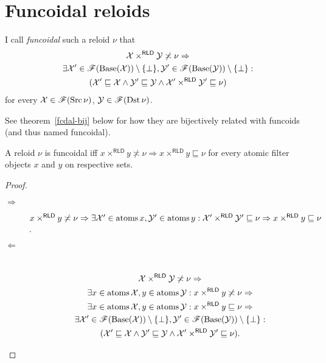 \section{\label{fcd-rld}Funcoidal reloids}
\begin{defn}
I call \emph{funcoidal} such a reloid $\nu$
that
\begin{multline*}
\mathcal{X}\times^{\mathsf{RLD}}\mathcal{Y}\not\asymp\nu\Rightarrow\\
\exists\mathcal{X}'\in\mathscr{F}(\operatorname{Base}(\mathcal{X}))\setminus\{\bot\},\mathcal{Y}'\in\mathscr{F}(\operatorname{Base}(\mathcal{Y}))\setminus\{\bot\}:\\
(\mathcal{X}'\sqsubseteq\mathcal{X}\land\mathcal{Y}'\sqsubseteq\mathcal{Y}\land\mathcal{X}'\times^{\mathsf{RLD}}\mathcal{Y}'\sqsubseteq\nu)
\end{multline*}
for every $\mathcal{X}\in\mathscr{F}(\operatorname{Src}\nu)$, $\mathcal{Y}\in\mathscr{F}(\operatorname{Dst}\nu)$.\end{defn}
\begin{rem}
See theorem~\ref{fcdal-bij} below for how they are bijectively related with funcoids (and thus named funcoidal).
\end{rem}
\begin{prop}
A reloid $\nu$ is funcoidal iff $x\times^{\mathsf{RLD}}y\nasymp\nu\Rightarrow x\times^{\mathsf{RLD}}y\sqsubseteq\nu$
for every atomic filter objects $x$ and $y$ on respective sets.\end{prop}
\begin{proof}
~
\begin{description}
\item [{$\Rightarrow$}] $x\times^{\mathsf{RLD}}y\not\asymp\nu\Rightarrow\exists\mathcal{X}'\in\operatorname{atoms} x,\mathcal{Y}'\in\operatorname{atoms} y:\mathcal{X}'\times^{\mathsf{RLD}}\mathcal{Y}'\sqsubseteq\nu\Rightarrow x\times^{\mathsf{RLD}}y\sqsubseteq\nu$.
\item [{$\Leftarrow$}] ~
\begin{multline*}
\mathcal{X}\times^{\mathsf{RLD}}\mathcal{Y}\not\asymp\nu\Rightarrow\\
\exists x\in\operatorname{atoms}\mathcal{X},y\in\operatorname{atoms}\mathcal{Y}:x\times^{\mathsf{RLD}}y\not\asymp\nu\Rightarrow\\
\exists x\in\operatorname{atoms}\mathcal{X},y\in\operatorname{atoms}\mathcal{Y}:x\times^{\mathsf{RLD}}y\sqsubseteq\nu\Rightarrow\\
\exists\mathcal{X}'\in\mathscr{F}(\operatorname{Base}(\mathcal{X}))\setminus\{\bot\},\mathcal{Y}'\in\mathscr{F}(\operatorname{Base}(\mathcal{Y}))\setminus\{\bot\}:\\
(\mathcal{X}'\sqsubseteq\mathcal{X}\land\mathcal{Y}'\sqsubseteq\mathcal{Y}\land\mathcal{X}'\times^{\mathsf{RLD}}\mathcal{Y}'\sqsubseteq\nu).
\end{multline*}

\end{description}
\end{proof}
